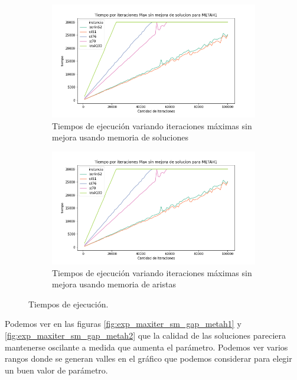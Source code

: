 \documentclass[10pt,a4paper]{article}
\begin{document}
\begin{figure}[h!]
    \centering
    \captionsetup{justification=centering}
    \begin{subfigure}{0.45\linewidth}
        \centering
        \includegraphics[scale=0.35]{Graphs-metaH/max-iter-sm-tiempo-METAH1}
        \caption{Tiempos de ejecución variando iteraciones máximas sin mejora usando memoria de soluciones}
        \label{fig:exp_maxiter_sm_tiempo_metah1}
    \end{subfigure}
    \begin{subfigure}{0.45\linewidth}
        \centering
        \includegraphics[scale=0.35]{Graphs-metaH/max-iter-sm-tiempo-METAH1}
        \caption{Tiempos de ejecución variando iteraciones máximas sin mejora usando memoria de aristas}
        \label{fig:exp_maxiter_sm_tiempo_metah2}
    \end{subfigure}
    \caption{Tiempos de ejecución.}
\end{figure}

Podemos ver en las figuras \ref{fig:exp_maxiter_sm_gap_metah1} y \ref{fig:exp_maxiter_sm_gap_metah2} que la calidad de las soluciones pareciera mantenerse oscilante a medida que aumenta el parámetro. Podemos ver varios rangos donde se generan valles en el gráfico que podemos considerar para elegir un buen valor de parámetro.
\end{document}
